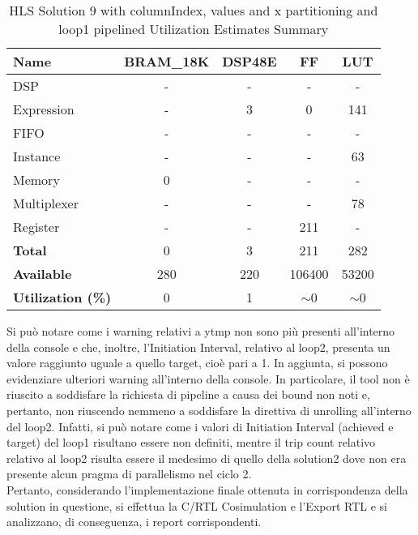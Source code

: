 \begin{table}[H]
	\centering
	\begin{tabular}{|l|c|c|c|c|}
		\hline
		\textbf{Name}    & \textbf{BRAM\_18K} & \textbf{DSP48E} & \textbf{FF} & \textbf{LUT} \\ \hline
		DSP              & -                   & -               & -           & -            \\ 
		Expression       & -                   & 3              & 0           & 141          \\ 
		FIFO             & -                   & -               & -           & -            \\ 
		Instance         & -                   & -               & -           & 63            \\ 
		Memory           & 0                   & -               & -          & -            \\ 
		Multiplexer      & -                   & -               & -           & 78          \\ 
		Register         & -                   & -               & 211         & -            \\ \hline
		\textbf{Total}   & 0                   & 3               & 211         & 282          \\ \hline
		\textbf{Available} & 280               & 220             & 106400      & 53200        \\ \hline
		\textbf{Utilization (\%)} & 0            & 1               & $\sim$0     & $\sim$0      \\ \hline
	\end{tabular}
	\caption{HLS Solution 9 with columnIndex, values and x partitioning and loop1 pipelined Utilization Estimates Summary}
	\label{tab:hls-solution-7-loop1-pipeline-utilization-estimates-summary}
\end{table}

Si può notare come i warning relativi a ytmp non sono più presenti all'interno della console e che, inoltre, l'Initiation Interval, relativo al loop2, presenta un valore raggiunto uguale a quello target, cioè pari a 1. In aggiunta, si possono evidenziare ulteriori warning all'interno della console. In particolare, il tool non è riuscito a soddisfare la richiesta di pipeline a causa dei bound non noti e, pertanto, non riuscendo nemmeno a soddisfare la direttiva di unrolling all'interno del loop2. Infatti, si può notare come i valori di Initiation Interval (achieved e target) del loop1 risultano essere non definiti, mentre il trip count relativo relativo al loop2 risulta essere il medesimo di quello della solution2 dove non era presente alcun pragma di parallelismo nel ciclo 2.
\\
Pertanto, considerando l'implementazione finale ottenuta in corrispondenza della solution in questione, si effettua la C/RTL Cosimulation e l'Export RTL e si analizzano, di conseguenza, i report corrispondenti.

